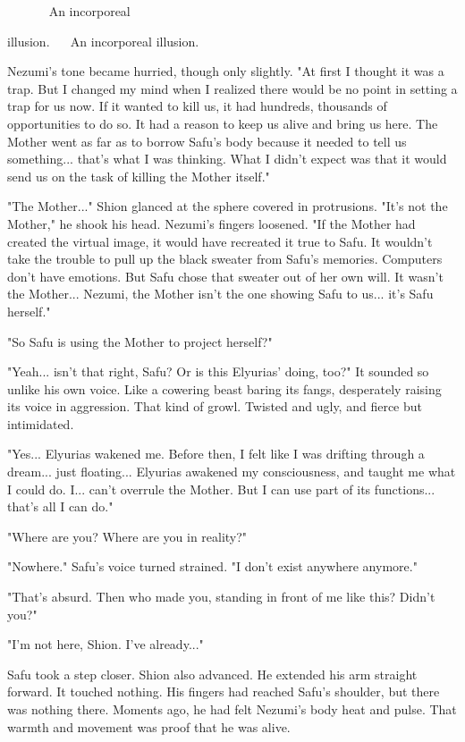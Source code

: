 ~ ~ ~ ~ An incorporeal

illusion. ~ ~An incorporeal illusion.

Nezumi's tone became hurried, though only slightly. "At first I thought
it was a trap. But I changed my mind when I realized there would be no
point in setting a trap for us now. If it wanted to kill us, it had
hundreds, thousands of opportunities to do so. It had a reason to keep
us alive and bring us here. The Mother went as far as to borrow Safu's
body because it needed to tell us something... that's what I was
thinking. What I didn't expect was that it would send us on the task of
killing the Mother itself."

"The Mother..." Shion glanced at the sphere covered in protrusions.
"It's not the Mother," he shook his head. Nezumi's fingers loosened. "If
the Mother had created the virtual image, it would have recreated it
true to Safu. It wouldn't take the trouble to pull up the black sweater
from Safu's memories. Computers don't have emotions. But Safu chose that
sweater out of her own will. It wasn't the Mother... Nezumi, the Mother
isn't the one showing Safu to us... it's Safu herself."

"So Safu is using the Mother to project herself?"

"Yeah... isn't that right, Safu? Or is this Elyurias' doing, too?" It
sounded so unlike his own voice. Like a cowering beast baring its fangs,
desperately raising its voice in aggression. That kind of growl. Twisted
and ugly, and fierce but intimidated.

"Yes... Elyurias wakened me. Before then, I felt like I was drifting
through a dream... just floating... Elyurias awakened my consciousness,
and taught me what I could do. I... can't overrule the Mother. But I can
use part of its functions... that's all I can do."

"Where are you? Where are you in reality?"

"Nowhere." Safu's voice turned strained. "I don't exist anywhere
anymore."

"That's absurd. Then who made you, standing in front of me like this?
Didn't you?"

"I'm not here, Shion. I've already..."

Safu took a step closer. Shion also advanced. He extended his arm
straight forward. It touched nothing. His fingers had reached Safu's
shoulder, but there was nothing there. Moments ago, he had felt Nezumi's
body heat and pulse. That warmth and movement was proof that he was
alive.

